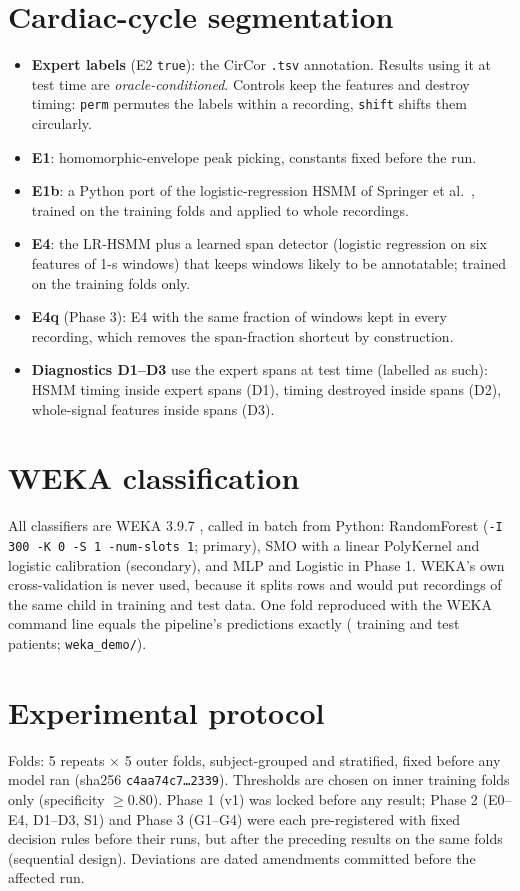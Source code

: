 \documentclass[11pt,a4paper]{article}
\begin{document}
\section{Cardiac-cycle segmentation}
\begin{itemize}\setlength\itemsep{1pt}
\item \textbf{Expert labels} (E2 \texttt{true}): the CirCor \texttt{.tsv} annotation. Results using it at test time are
\emph{oracle-conditioned}. Controls keep the features and destroy timing: \texttt{perm} permutes the labels within a
recording, \texttt{shift} shifts them circularly.
\item \textbf{E1}: homomorphic-envelope peak picking, constants fixed before the run.
\item \textbf{E1b}: a Python port of the logistic-regression HSMM of Springer et al.\ \cite{springer2016}, trained on the
training folds and applied to whole recordings.
\item \textbf{E4}: the LR-HSMM plus a learned span detector (logistic regression on six features of 1-s windows) that keeps
windows likely to be annotatable; trained on the training folds only.
\item \textbf{E4q} (Phase 3): E4 with the same fraction of windows kept in every recording, which removes the
span-fraction shortcut by construction.
\item \textbf{Diagnostics D1--D3} use the expert spans at test time (labelled as such): HSMM timing inside expert spans
(D1), timing destroyed inside spans (D2), whole-signal features inside spans (D3).
\end{itemize}

\section{WEKA classification}
All classifiers are WEKA 3.9.7 \cite{frank2016}, called in batch from Python: RandomForest \cite{breiman2001}
(\texttt{-I 300 -K 0 -S 1 -num-slots 1}; primary), SMO \cite{platt1998} with a linear PolyKernel and logistic calibration
(secondary), and MLP and Logistic in Phase 1. WEKA's own cross-validation is never used, because it splits rows and would
put recordings of the same child in training and test data. One fold reproduced with the WEKA command line equals the
pipeline's predictions exactly ( training and  test patients;
\texttt{weka\_demo/}).

\section{Experimental protocol}
Folds: 5 repeats $\times$ 5 outer folds, subject-grouped and stratified, fixed before any model ran (sha256
\texttt{c4aa74c7\ldots2339}). Thresholds are chosen on inner training folds only (specificity $\geq 0.80$). Phase 1 (v1)
was locked before any result; Phase 2 (E0--E4, D1--D3, S1) and Phase 3 (G1--G4) were each pre-registered with fixed
decision rules before their runs, but after the preceding results on the same folds (sequential design). Deviations are
dated amendments committed before the affected run.
\end{document}
